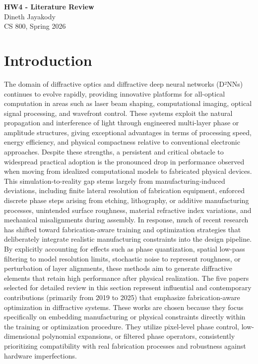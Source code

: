 \documentclass[12pt]{article}
\begin{document}
\begin{centering}
{\large\textbf{HW4 - Literature Review}}\\
\vspace{3mm} %
Dineth Jayakody\\
CS 800, Spring 2026\\
\end{centering}



\section{Introduction}
The domain of diffractive optics and diffractive deep neural networks (D²NNs) continues to evolve rapidly, providing innovative platforms for all-optical computation in areas such as laser beam shaping, computational imaging, optical signal processing, and wavefront control. These systems exploit the natural propagation and interference of light through engineered multi-layer phase or amplitude structures, giving exceptional advantages in terms of processing speed, energy efficiency, and physical compactness relative to conventional electronic approaches. Despite these strengths, a persistent and critical obstacle to widespread practical adoption is the pronounced drop in performance observed when moving from idealized computational models to fabricated physical devices. This simulation-to-reality gap stems largely from manufacturing-induced deviations, including finite lateral resolution of fabrication equipment, enforced discrete phase steps arising from etching, lithography, or additive manufacturing processes, unintended surface roughness, material refractive index variations, and mechanical misalignments during assembly. In response, much of recent research has shifted toward fabrication-aware training and optimization strategies that deliberately integrate realistic manufacturing constraints into the design pipeline. By explicitly accounting for effects such as phase quantization, spatial low-pass filtering to model resolution limits, stochastic noise to represent roughness, or perturbation of layer alignments, these methods aim to generate diffractive elements that retain high performance after physical realization. The five papers selected for detailed review in this section represent influential and contemporary contributions (primarily from 2019 to 2025) that emphasize fabrication-aware optimization in diffractive systems. These works are chosen because they focus specifically on embedding manufacturing or physical constraints directly within the training or optimization procedure. They utilize pixel-level phase control, low-dimensional polynomial expansions, or filtered phase operators, consistently prioritizing compatibility with real fabrication processes and robustness against hardware imperfections.
\end{document}
